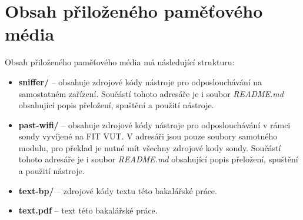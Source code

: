 \chapter{Obsah přiloženého paměťového média}
Obsah přiloženého paměťového média má následující strukturu:
\begin{itemize}
  \item{\textbf{sniffer/} -- obsahuje zdrojové kódy nástroje pro odposlouchávání na samostatném zařízení. Součástí tohoto adresáře je i soubor \textit{README.md} obsahující popis přeložení, spuštění a použití nástroje.}
  \item{\textbf{past-wifi/} -- obsahuje zdrojové kódy nástroje pro odposlouchávání v rámci sondy vyvíjené na FIT VUT. V adresáři jsou pouze soubory samotného modulu, pro překlad je nutné mít všechny zdrojové kody sondy. Součástí tohoto adresáře je i soubor \textit{README.md} obsahující popis přeložení, spuštění a použití nástroje.}
  \item{\textbf{text-bp/} -- zdrojové kódy textu této bakalářské práce.}
  \item{\textbf{text.pdf} -- text této bakalářské práce.}
\end{itemize}